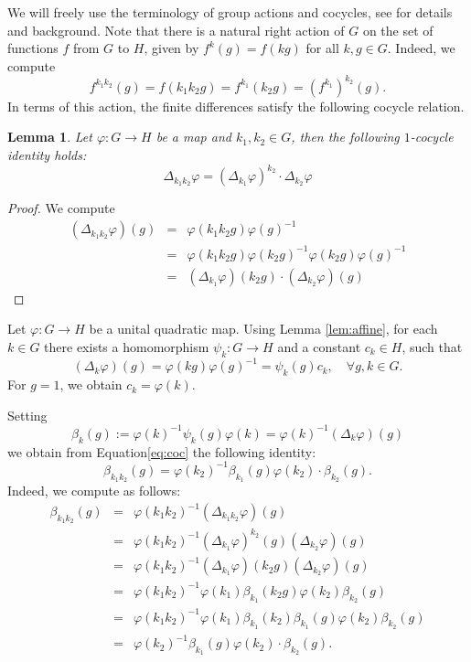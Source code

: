 \documentclass[a4paper,11pt]{amsproc}
\theoremstyle{plain}
\newtheorem{lemma}[theorem]{Lemma}
\theoremstyle{definition}
\begin{document}
We will freely use the terminology of group actions and cocycles, see \cite{MR1324339} for details and background.
Note that there is a natural right action of $G$ on the set of functions $f$ from $G$ to $H$, given by $f^{k}(g)=f(kg)$ for all $k,g \in G$. Indeed, we compute \[f^{k_1k_2}(g)=f(k_1k_2g) = f^{k_1}(k_2g) = (f^{k_1})^{k_2}(g).\] In terms of this action, the finite differences satisfy the following cocycle relation. 

\begin{lemma}
Let $\varphi \colon G \to H$ be a map and $k_1,k_2 \in G$, then the following $1$-cocycle identity holds:
\begin{equation} \label{eq:coc}
\Delta_{k_1k_2} \varphi = (\Delta_{k_1} \varphi)^{k_2} \cdot \Delta_{k_2} \varphi
\end{equation}
\end{lemma}
\begin{proof}
We compute \begin{eqnarray*}
(\Delta_{k_1k_2} \varphi)(g)&=&\varphi(k_1k_2g)\varphi(g)^{-1} \\
&=& \varphi(k_1k_2g)\varphi(k_2g)^{-1}\varphi(k_2g)\varphi(g)^{-1} \\
&=& (\Delta_{k_1} \varphi)(k_2g) \cdot (\Delta_{k_2}\varphi)(g)
\end{eqnarray*}
\end{proof}

Let $\varphi \colon G \to H$ be a unital quadratic map. Using Lemma \ref{lem:affine}, for each $k \in G$ there exists a homomorphism $\psi_k \colon G \to H$ and a constant $c_k \in H$, such that
$$(\Delta_k \varphi)(g)=\varphi(kg)\varphi(g)^{-1} = \psi_k(g)c_k, \quad \forall g,k \in G.$$
For $g=1$, we obtain $c_k=\varphi(k).$ 

Setting
$$\beta_k(g):= \varphi(k)^{-1} \psi_k(g) \varphi(k) = \varphi(k)^{-1} (\Delta_k \varphi)(g)$$ we obtain from Equation\eqref{eq:coc} the following identity:
\begin{equation} \label{eq:cocycbeta}
\beta_{k_1k_2}(g) = \varphi(k_2)^{-1}\beta_{k_1}(g)\varphi(k_2) \cdot \beta_{k_2}(g).
\end{equation}
Indeed, we compute as follows:
\begin{eqnarray*}
\beta_{k_1k_2}(g) &=& \varphi(k_1k_2)^{-1} (\Delta_{k_1k_2} \varphi)(g)    \\
&=& \varphi(k_1k_2)^{-1} (\Delta_{k_1} \varphi)^{k_2}(g)  (\Delta_{k_2} \varphi)(g) \\
&=& \varphi(k_1k_2)^{-1} (\Delta_{k_1} \varphi)(k_2g)  (\Delta_{k_2} \varphi)(g) \\
&=& \varphi(k_1k_2)^{-1} \varphi(k_1) \beta_{k_1}(k_2g) \varphi(k_2) \beta_{k_2}(g) \\
&=& \varphi(k_1k_2)^{-1} \varphi(k_1) \beta_{k_1}(k_2) \beta_{k_1}(g) \varphi(k_2) \beta_{k_2}(g) \\
&=& \varphi(k_2)^{-1} \beta_{k_1}(g) \varphi(k_2) \cdot \beta_{k_2}(g).
\end{eqnarray*}
\end{document}
